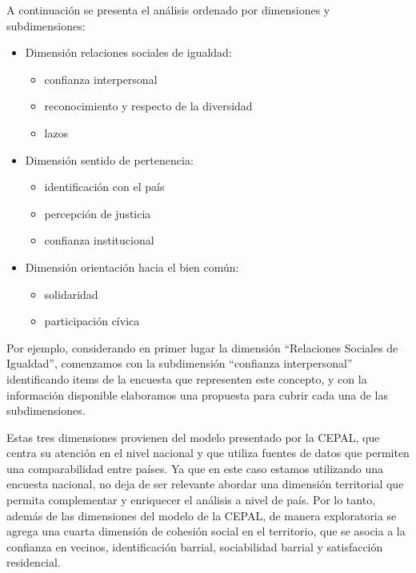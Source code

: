 \documentclass[
  12pt,
]{book}
\providecommand{\tightlist}{%
  \setlength{\itemsep}{0pt}\setlength{\parskip}{0pt}}
\begin{document}
A continuación se presenta el análisis ordenado por dimensiones y subdimensiones:

\begin{itemize}
\tightlist
\item
  Dimensión relaciones sociales de igualdad:

  \begin{itemize}
  \tightlist
  \item
    confianza interpersonal
  \item
    reconocimiento y respecto de la diversidad
  \item
    lazos
  \end{itemize}
\item
  Dimensión sentido de pertenencia:

  \begin{itemize}
  \tightlist
  \item
    identificación con el país
  \item
    percepción de justicia
  \item
    confianza institucional
  \end{itemize}
\item
  Dimensión orientación hacia el bien común:

  \begin{itemize}
  \tightlist
  \item
    solidaridad
  \item
    participación cívica
  \end{itemize}
\end{itemize}

Por ejemplo, considerando en primer lugar la dimensión ``Relaciones Sociales de Igualdad'', comenzamos con la subdimensión ``confianza interpersonal'' identificando items de la encuesta que representen este concepto, y con la información disponible elaboramos una propuesta para cubrir cada una de las subdimensiones.

Estas tres dimensiones provienen del modelo presentado por la CEPAL, que centra su atención en el nivel nacional y que utiliza fuentes de datos que permiten una comparabilidad entre países. Ya que en este caso estamos utilizando una encuesta nacional, no deja de ser relevante abordar una dimensión territorial que permita complementar y enriquecer el análisis a nivel de país. Por lo tanto, además de las dimensiones del modelo de la CEPAL, de manera exploratoria se agrega una cuarta dimensión de cohesión social en el territorio, que se asocia a la confianza en vecinos, identificación barrial, sociabilidad barrial y satisfacción residencial.
\end{document}
